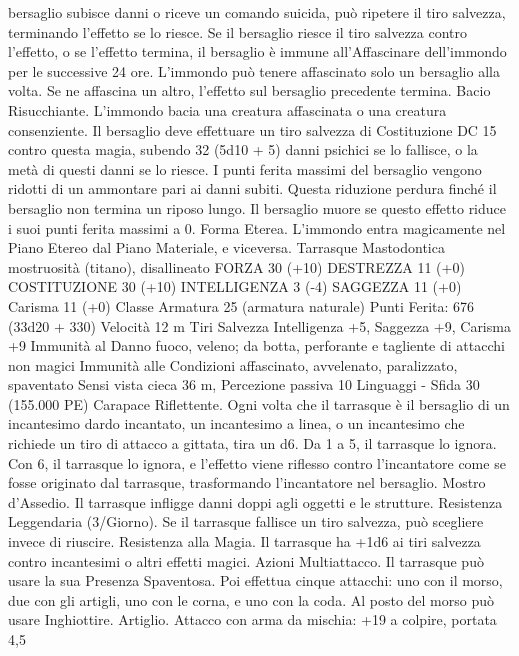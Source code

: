 \begin{multicols}{2}
bersaglio subisce danni o riceve un comando suicida, può
ripetere il tiro salvezza, terminando l’effetto se lo riesce. Se il
bersaglio riesce il tiro salvezza contro l’effetto, o se l’effetto
termina, il bersaglio è immune all’Affascinare dell’immondo per
le successive 24 ore.
L’immondo può tenere affascinato solo un bersaglio alla volta.
Se ne affascina un altro, l’effetto sul bersaglio precedente
termina.
Bacio Risucchiante. L’immondo bacia una creatura affascinata o
una creatura consenziente. Il bersaglio deve effettuare un tiro
salvezza di Costituzione DC 15 contro questa magia, subendo 32
(5d10 + 5) danni psichici se lo fallisce, o la metà di questi danni
se lo riesce. I punti ferita massimi del bersaglio vengono ridotti
di un ammontare pari ai danni subiti. Questa riduzione perdura
finché il bersaglio non termina un riposo lungo. Il bersaglio
muore se questo effetto riduce i suoi punti ferita massimi a 0.
Forma Eterea. L’immondo entra magicamente nel Piano Etereo
dal Piano Materiale, e viceversa.
Tarrasque
Mastodontica mostruosità (titano), disallineato
FORZA 30 (+10)
DESTREZZA 11 (+0)
COSTITUZIONE 30 (+10)
INTELLIGENZA 3 (-4)
SAGGEZZA 11 (+0)
Carisma 11 (+0)
Classe Armatura 25 (armatura naturale)
\hspace*{0pt}\hfill{Punti Ferita}: 676 (33d20 + 330)
Velocità 12 m
Tiri Salvezza Intelligenza +5, Saggezza +9, Carisma +9
Immunità al Danno fuoco, veleno; da botta, perforante e
tagliente di attacchi non magici
Immunità alle Condizioni affascinato, avvelenato, paralizzato,
spaventato
Sensi vista cieca 36 m, Percezione passiva 10
Linguaggi -
Sfida 30 (155.000 PE)
Carapace Riflettente. Ogni volta che il tarrasque è il bersaglio di
un incantesimo dardo incantato, un incantesimo a linea, o un
incantesimo che richiede un tiro di attacco a gittata, tira un d6.
Da 1 a 5, il tarrasque lo ignora. Con 6, il tarrasque lo ignora, e
l’effetto viene riflesso contro l’incantatore come se fosse
originato dal tarrasque, trasformando l’incantatore nel bersaglio.
Mostro d’Assedio. Il tarrasque infligge danni doppi agli oggetti e
le strutture.
Resistenza Leggendaria (3/Giorno). Se il tarrasque fallisce un
tiro salvezza, può scegliere invece di riuscire.
Resistenza alla Magia. Il tarrasque ha +1d6 ai tiri salvezza
contro incantesimi o altri effetti magici.
Azioni
Multiattacco. Il tarrasque può usare la sua Presenza Spaventosa.
Poi effettua cinque attacchi: uno con il morso, due con gli artigli,
uno con le corna, e uno con la coda. Al posto del morso può
usare Inghiottire.
Artiglio. Attacco con arma da mischia: +19 a colpire, portata 4,5

\end{multicols}
